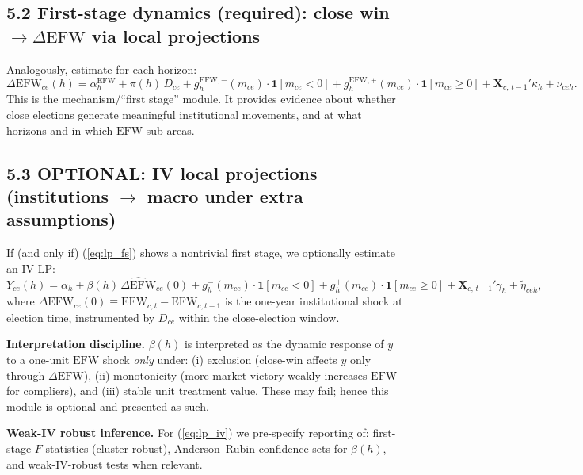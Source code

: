 \documentclass[11pt]{article}
\newcommand{\EFW}{\mathrm{EFW}}
\newcommand{\IV}{\mathrm{IV}}
\newcommand{\bX}{\mathbf{X}}
\newcommand{\1}{\mathbf{1}}
\newcommand{\cid}{c}
\newcommand{\eid}{e}
\begin{document}
\subsection*{5.2 First-stage dynamics (required): close win $\rightarrow \Delta \EFW$ via local projections}
Analogously, estimate for each horizon:
\begin{equation}
\Delta \EFW_{\cid \eid}(h) = \alpha^{\EFW}_h + \pi(h)\, D_{\cid \eid} + g_{h}^{\EFW,-}(m_{\cid \eid})\cdot \1[m_{\cid \eid}<0] + g_{h}^{\EFW,+}(m_{\cid \eid})\cdot \1[m_{\cid \eid}\ge 0] + \bX_{\cid,\,t-1}'\kappa_h + \nu_{\cid \eid h}.
\label{eq:lp_fs}
\end{equation}
This is the mechanism/``first stage'' module. It provides evidence about whether close elections generate meaningful institutional movements, and at what horizons and in which $\EFW$ sub-areas.

\subsection*{5.3 OPTIONAL: IV local projections (institutions $\rightarrow$ macro under extra assumptions)}
If (and only if) (\ref{eq:lp_fs}) shows a nontrivial first stage, we optionally estimate an $\IV$-LP:
\begin{equation}
Y_{\cid \eid}(h) = \alpha_h + \beta(h)\, \widehat{\Delta \EFW}_{\cid \eid}(0) + g_{h}^{-}(m_{\cid \eid})\cdot \1[m_{\cid \eid}<0] + g_{h}^{+}(m_{\cid \eid})\cdot \1[m_{\cid \eid}\ge 0] + \bX_{\cid,\,t-1}'\gamma_h + \tilde{\eta}_{\cid \eid h},
\label{eq:lp_iv}
\end{equation}
where $\Delta \EFW_{\cid \eid}(0)\equiv \EFW_{\cid,t}-\EFW_{\cid,t-1}$ is the one-year institutional shock at election time, instrumented by $D_{\cid \eid}$ within the close-election window.

\textbf{Interpretation discipline.} $\beta(h)$ is interpreted as the dynamic response of $y$ to a one-unit $\EFW$ shock \emph{only} under:
(i) exclusion (close-win affects $y$ only through $\Delta \EFW$),
(ii) monotonicity (more-market victory weakly increases $\EFW$ for compliers),
and (iii) stable unit treatment value. These may fail; hence this module is optional and presented as such.

\textbf{Weak-IV robust inference.} For (\ref{eq:lp_iv}) we pre-specify reporting of: first-stage $F$-statistics (cluster-robust), Anderson--Rubin confidence sets for $\beta(h)$, and weak-IV-robust tests when relevant.
\end{document}
